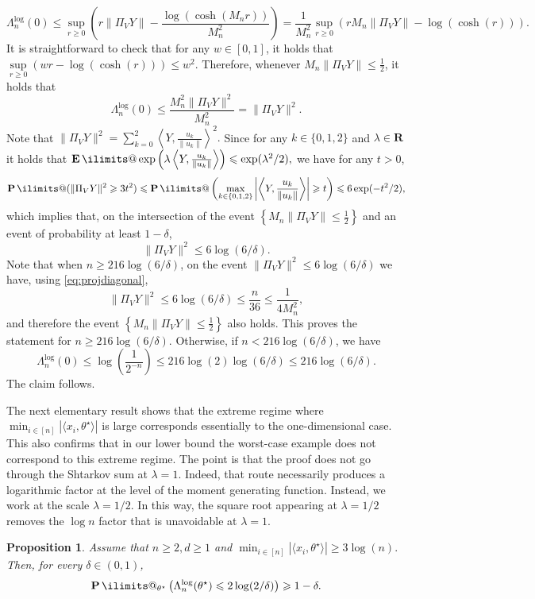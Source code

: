 \documentclass[11pt, letterpaper, hidelinks]{article}
\makeatletter
\renewcommand{\proofname}{\textit{\textbf{Proof}}}
\renewenvironment{proof}[1][\proofname]{\par\pushQED{\qed}\normalfont \topsep6\p@\@plus6\p@\relax\trivlist\item[\hskip\labelsep#1\@addpunct{}]\ignorespaces}{\popQED\endtrivlist\@endpefalse}
\newcommand{\R}{\mathbf R}
\newcommand{\1}{\mathbf 1}
\renewcommand{\le}{\leqslant}
\renewcommand{\ge}{\geqslant}
\renewcommand{\leq}{\leqslant}
\renewcommand{\geq}{\geqslant}
\newcommand{\E}{\operatorname*{\mathbf{E}}\ilimits@}
\renewcommand{\P}{\operatorname*{\mathbf{P}}\ilimits@}
\theoremstyle{plain}
\newtheorem{proposition}{Proposition}[section]
\theoremstyle{definition}
\newcommand{\thetastar}{\theta^\star}
\makeatother
\begin{document}
\begin{proof}
\[
\Lambda_n^{\operatorname{log}}(0)
\le
\sup_{r \geq 0}\left(r \|\Pi_{V} Y\| - \frac{\log(\cosh(M_n r))}{M_n^2}\right)
=
\frac{1}{M_n^2} \sup\limits_{r \geq 0}\left(r M_n \|\Pi_{V} Y\| - \log(\cosh(r))\right).
\]
It is straightforward to check that for any $w \in [0,1]$, it holds that
$
\sup\limits_{r \geq 0}(w r - \log(\cosh(r))) \leq w^2.
$
Therefore, whenever $M_n \|\Pi_{V} Y\| \leq \frac{1}{2}$, it holds that
\[
\Lambda_n^{\operatorname{log}}(0) \leq \frac{M_n^2 \|\Pi_{V} Y\|^2}{M_n^2} = \|\Pi_{V} Y\|^2.
\]
Note that
$
\|\Pi_{V} Y\|^2 = \sum_{k = 0}^2 \left\langle Y, \frac{u_k}{\|u_k\|} \right\rangle^2.
$
Since for any $k \in \{0,1,2\}$ and $\lambda \in \R$ it holds that
$
\E\exp\left(\lambda \left\langle Y, \frac{u_k}{\|u_k\|} \right\rangle\right) \leq \exp(\lambda^2/2),
$
we have for any $t > 0$,
\[
\P(\|\Pi_{V} Y\|^2 \geq 3 t^2)
\le
\P\left(\max_{k \in \{0,1,2\}} \left|\left\langle Y, \frac{u_k}{\|u_k\|} \right\rangle\right| \geq t \right)
\le
6\exp(-t^2/2),
\]
which implies that, on the intersection of the event $\left\{M_n \|\Pi_{V} Y\| \leq \frac{1}{2}\right\}$ and an event of probability at least $1-\delta$,
\[
\|\Pi_{V} Y\|^2 \leq 6\log(6/\delta).
\]
Note that when $n \geq 216\log(6/\delta)$, on the event $\|\Pi_{V} Y\|^2 \leq 6\log(6/\delta)$ we have, using \eqref{eq:projdiagonal},
\[
\|\Pi_{V} Y\|^2 \leq 6\log(6/\delta) \leq \frac{n}{36} \leq \frac{1}{4M_n^2},
\]
and therefore the event $\left\{M_n \|\Pi_{V} Y\| \leq \frac{1}{2}\right\}$ also holds. This proves the statement for $n \geq 216\log(6/\delta)$. Otherwise, if $n < 216\log(6/\delta)$, we have
\[
\Lambda_n^{\operatorname{log}}(0) \leq \log\left(\frac{1}{2^{-n}}\right) \leq 216\log(2)\log(6/\delta) \leq 216\log(6/\delta).
\]
The claim follows.
\end{proof}


The next elementary result shows that the extreme regime where
$\min_{i \in [n]}|\langle x_i, \thetastar\rangle|$ is large corresponds
essentially to the one-dimensional case. This also confirms that in our lower
bound the worst-case example does not correspond to this extreme regime. The point is that the proof does {not} go through the Shtarkov sum at $\lambda=1$. Indeed, that route necessarily produces a logarithmic factor at the level of the moment generating function. Instead, we work at the scale $\lambda=1/2$. In this way, the square root appearing at $\lambda=1/2$ removes the $\log n$ factor that is unavoidable at $\lambda=1$.

\begin{proposition}
\label{prop:large-margin-fixed-design}
Assume that $n\geq 2, d \geq 1$ and
$
\min_{i\in[n]} |\langle x_i,\thetastar\rangle|
\ge
3\log(n).
$
Then, for every $\delta\in (0, 1)$,
\[
\P_{\thetastar}\left(
\Lambda_n^{\operatorname{log}}(\thetastar)
\le
2\log(2/\delta)
\right)
\ge
1-\delta.
\]
\end{proposition}
\end{document}
